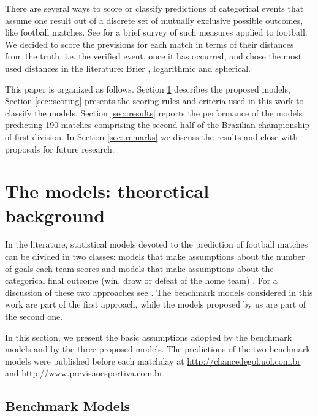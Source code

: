 \documentclass[journal,article,accept,moreauthors,pdftex,12pt,a4paper]{mdpi}
\begin{document}
There are several ways to score or classify predictions of categorical events that assume one result out of a discrete set of mutually exclusive possible outcomes, like football matches.
See \cite{constantinou} for a brief survey of such measures applied to football.
We decided to score the previsions for each match in terms of their distances from the truth, i.e. the verified event, once it has occurred, and chose the most used distances in the literature: Brier \cite{brier1950}, logarithmic and spherical.

This paper is organized as follows.
Section \ref{sec::experimental} describes the proposed models, Section \ref{sec::scoring} presents the scoring rules and criteria used in this work to classify the models.
Section \ref{sec::results} reports the performance of the models predicting 190 matches comprising the second half of the Brazilian championship of first division.
In Section \ref{sec::remarks} we discuss the results and close with proposals for future research.



\section{The models: theoretical background}
\label{sec::experimental}

In the literature, statistical models devoted to the prediction of
football matches can be divided in two classes: models that make
assumptions about the number of goals each team scores
\citep{Maher82, Dixon97, Karlis2003} and models that make
assumptions about the categorical final outcome (win, draw or defeat
of the home team) \citep{Forrest2000, Koning2000, Brillinger2008,
Brillinger2009}. For a discussion of these two approaches see
\cite{Goddard2005}. The benchmark models considered in this work are
part of the first approach, while the models proposed by us are part
of the second one.

In this section, we present the basic assumptions adopted by the benchmark models and 
by the three proposed models. The predictions of the
two benchmark models were published before each matchday at
\url{http://chancedegol.uol.com.br} and
\url{http://www.previsaoesportiva.com.br}.

\subsection{Benchmark Models}
\label{sec::Benchmark}
\end{document}
